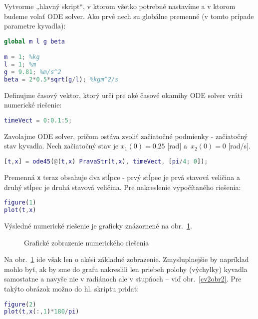 \documentclass[a4paper, 10pt, ]{article}
\begin{document}
Vytvorme „hlavný skript“, v ktorom všetko potrebné nastavíme a v ktorom budeme volať ODE solver. Ako prvé nech su globálne premenné (v tomto prípade parametre kyvadla):
\begin{lstlisting}[language=Matlab, title=Časť súbora hlSkript.m, name=hlSkript]
global m l g beta

m = 1; %kg
l = 1; %m
g = 9.81; %m/s^2
beta = 2*0.5*sqrt(g/l); %kgm^2/s
\end{lstlisting}
Definujme časový vektor, ktorý určí pre aké časové okamihy ODE solver vráti numerické riešenie:
\begin{lstlisting}[language=Matlab, title=Časť súbora hlSkript.m, name=hlSkript]
timeVect = 0:0.1:5;
\end{lstlisting}
Zavolajme ODE solver, pričom ostáva zvoliť začiatočné podmienky - začiatočný stav kyvadla. Nech začiatočný stav je $x_1(0) = 0.25$ [rad] a~$x_2(0) = 0$ [rad/s].
\begin{lstlisting}[language=Matlab, title=Časť súbora hlSkript.m, name=hlSkript]
[t,x] = ode45(@(t,x) PravaStr(t,x), timeVect, [pi/4; 0]);
\end{lstlisting}
Premenná \verb|x| teraz obsahuje dva stĺpce - prvý stĺpec je prvá stavová veličina a druhý stĺpec je druhá stavová veličina.
Pre nakreslenie vypočítaného riešenia:
\begin{lstlisting}[language=Matlab, title=Časť súbora hlSkript.m, name=hlSkript]
figure(1)
plot(t,x)
\end{lstlisting}
Výsledné numerické riešenie je graficky znázornené na obr.~\ref{cv2obr1}.


\begin{figure}[!ht]
	\centering


    \vspace{-1mm}

	\caption{Grafické zobrazenie numerického riešenia}
	\label{cv2obr1}
\end{figure}


Na obr.~\ref{cv2obr1} ide však len o akési základné zobrazenie. Zmysluplnejšie by napríklad mohlo byť, ak by sme do grafu nakreslili len priebeh polohy (výchylky) kyvadla samostatne a navyše nie v radiánoch ale v stupňoch -- viď obr.~\ref{cv2obr2}. Pre takýto obrázok možno do hl. skriptu pridať:
\begin{lstlisting}[language=Matlab, title=Časť súbora hlSkript.m, name=hlSkript]
figure(2)
plot(t,x(:,1)*180/pi)
\end{lstlisting}
\end{document}
